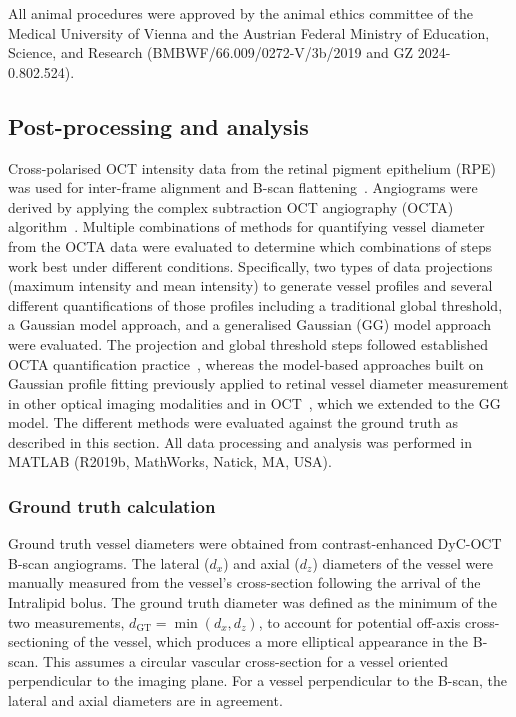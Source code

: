 All animal procedures were approved by the animal ethics committee of the Medical University of Vienna and the Austrian Federal Ministry of Education, Science, and Research (BMBWF/66.009/0272-V/3b/2019 and GZ 2024-0.802.524).

\subsection{Post-processing and analysis}
\label{subsec:postproc_dia}
Cross-polarised OCT intensity data from the retinal pigment epithelium (RPE) was used for inter-frame alignment and B-scan flattening~\cite{augustinMultifunctionalOCTImage2016,merkleHighresolutionDepthresolvedVascular2021}. Angiograms were derived by applying the complex subtraction OCT angiography (OCTA) algorithm~\cite{srinivasanRapidVolumetricAngiography2010}. Multiple combinations of methods for quantifying vessel diameter from the OCTA data were evaluated to determine which combinations of steps work best under different conditions. Specifically, two types of data projections (maximum intensity and mean intensity) to generate vessel profiles and several different quantifications of those profiles including a traditional global threshold, a Gaussian model approach, and a generalised Gaussian (GG) model approach were evaluated. The projection and global threshold steps followed established OCTA quantification practice~\cite{untrachtTowardsStandardisingRetinal2024,hormelMaximumValueProjection2018,sampsonTowardsStandardizingRetinal2022}, whereas the model-based approaches built on Gaussian profile fitting previously applied to retinal vessel diameter measurement in other optical imaging modalities and in OCT~\cite{zhouDetectionQuantificationRetinopathy1994,lowellMeasurementRetinalVessel2004,leahyMapping3DConnectivity2015}, which we extended to the GG model. The different methods were evaluated against the ground truth as described in this section. All data processing and analysis was performed in MATLAB (R2019b, MathWorks, Natick, MA, USA).

\subsubsection{Ground truth calculation}
\label{subsubsec:ground_truth}
Ground truth vessel diameters were obtained from contrast-enhanced DyC-OCT B-scan angiograms. The lateral ($d_x$) and axial ($d_z$) diameters of the vessel were manually measured from the vessel's cross-section following the arrival of the Intralipid bolus. The ground truth diameter was defined as the minimum of the two measurements, $d_{\mathrm{GT}} = \min(d_x, d_z)$, to account for potential off-axis cross-sectioning of the vessel, which produces a more elliptical appearance in the B-scan. This assumes a circular vascular cross-section for a vessel oriented perpendicular to the imaging plane. For a vessel perpendicular to the B-scan, the lateral and axial diameters are in agreement.


